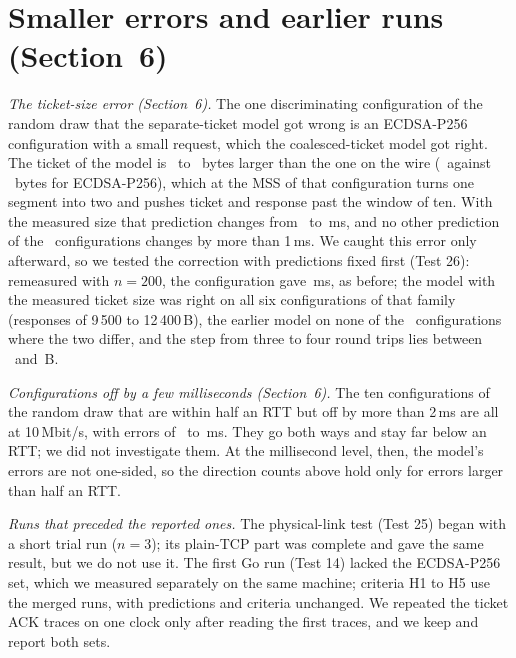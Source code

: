 \documentclass[9pt]{article}
\begin{document}
\section*{Smaller errors and earlier runs (Section~6)}
\emph{The ticket-size error (Section~6).} The one discriminating configuration of the random draw that the separate-ticket model got wrong is an ECDSA-P256 configuration with a small request, which the coalesced-ticket model got right. The ticket of the model is \TktDiffLo\ to \TktDiffHi\ bytes larger than the one on the wire (\TktModelEc\ against \TktWireEc\ bytes for ECDSA-P256), which at the MSS of that configuration turns one segment into two and pushes ticket and response past the window of ten. With the measured size that prediction changes from \TktCellOld\ to \TktCellNew\,ms, and no other prediction of the \GnineN\ configurations changes by more than 1\,ms. We caught this error only afterward, so we tested the correction with predictions fixed first (Test 26): remeasured with $n=200$, the configuration gave \GnineBRepeat\,ms, as before; the model with the measured ticket size was right on all six configurations of that family (responses of 9\,500 to 12\,400\,B), the earlier model on none of the \GnineBDisc\ configurations where the two differ, and the step from three to four round trips lies between \GnineBLo\ and \GnineBHi\,B.

\emph{Configurations off by a few milliseconds (Section~6).} The ten configurations of the random draw that are within half an RTT but off by more than 2\,ms are all at 10\,Mbit/s, with errors of \GnineOffLo\ to \GnineOffHi\,ms. They go both ways and stay far below an RTT; we did not investigate them. At the millisecond level, then, the model's errors are not one-sided, so the direction counts above hold only for errors larger than half an RTT.

\emph{Runs that preceded the reported ones.} The physical-link test (Test 25) began with a short trial run ($n=3$); its plain-TCP part was complete and gave the same result, but we do not use it. The first Go run (Test 14) lacked the ECDSA-P256 set, which we measured separately on the same machine; criteria H1 to H5 use the merged runs, with predictions and criteria unchanged. We repeated the ticket ACK traces on one clock only after reading the first traces, and we keep and report both sets.
\end{document}
